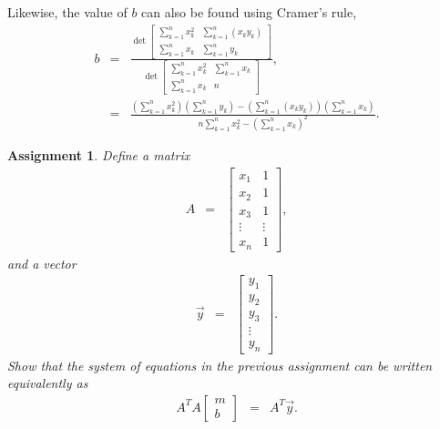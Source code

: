 \documentclass[12pt]{article}
\newtheorem{assignment}{Assignment}[section]
\newcommand{\lp}{\left(}
\newcommand{\rp}{\right)}
\begin{document}
Likewise, the value of $b$ can also be found using Cramer's rule,
\begin{eqnarray*}
  b & = & \frac{
\det \left[
    \begin{array}{rr}
      \sum_{k=1}^n x_k^2  &  \sum_{k=1}^n (x_k y_k)  \\
      \sum_{k=1}^n x_k & \sum_{k=1}^n y_k
    \end{array}
  \right]
    }{\det \left[
    \begin{array}{rr}
      \sum_{k=1}^n x_k^2  & \sum_{k=1}^n x_k \\
      \sum_{k=1}^n x_k & n
    \end{array}
  \right]}, \\
& = & \frac{\lp\sum_{k=1}^n x_k^2\rp\lp\sum_{k=1}^n y_k\rp
  - \lp\sum_{k=1}^n (x_k y_k)\rp\lp\sum_{k=1}^n x_k\rp
}{n \sum_{k=1}^n x_k^2 - \lp \sum_{k=1}^n x_k \rp^2}.
\end{eqnarray*}

\fi

\begin{assignment}
  Define a matrix
  \begin{eqnarray*}
    A & = & 
    \left[
      \begin{array}{rr}
        x_1 & 1 \\
        x_2 & 1 \\
        x_3 & 1 \\
        \vdots & \vdots \\
        x_n & 1
      \end{array}
    \right],
  \end{eqnarray*}
  and a vector 
  \begin{eqnarray*}
    \vec{y} & = & 
    \left[
      \begin{array}{r}
        y_1 \\
        y_2 \\
        y_3 \\
        \vdots  \\
        y_n 
      \end{array}
    \right].
  \end{eqnarray*}
  Show that the system of equations in the previous assignment can be
  written equivalently as
  \begin{eqnarray*}
    A^T A
    \left[
      \begin{array}{rr}
        m \\ b
      \end{array}
      \right] & = & A^T \vec{y}.
  \end{eqnarray*}
\end{assignment}
\end{document}
